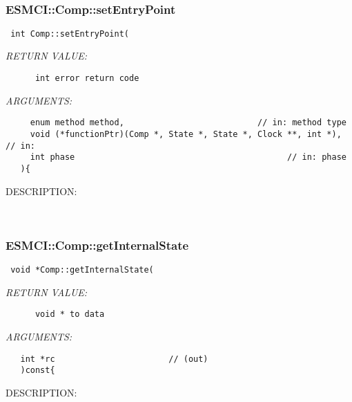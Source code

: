    
 
\mbox{}\hrulefill\
 
\subsubsection [ESMCI::Comp::setEntryPoint] {ESMCI::Comp::setEntryPoint}


  
\begin{verbatim} int Comp::setEntryPoint(\end{verbatim}{\em RETURN VALUE:}
\begin{verbatim}      int error return code\end{verbatim}{\em ARGUMENTS:}
\begin{verbatim}     enum method method,                           // in: method type
     void (*functionPtr)(Comp *, State *, State *, Clock **, int *), // in:
     int phase                                           // in: phase
   ){\end{verbatim}
{\sf DESCRIPTION:\\ }


   
 
\mbox{}\hrulefill\
 
\subsubsection [ESMCI::Comp::getInternalState] {ESMCI::Comp::getInternalState}


  
\begin{verbatim} void *Comp::getInternalState(\end{verbatim}{\em RETURN VALUE:}
\begin{verbatim}      void * to data\end{verbatim}{\em ARGUMENTS:}
\begin{verbatim}   int *rc                       // (out)
   )const{\end{verbatim}
{\sf DESCRIPTION:\\ }


   
 
\mbox{}\hrulefill\
 
